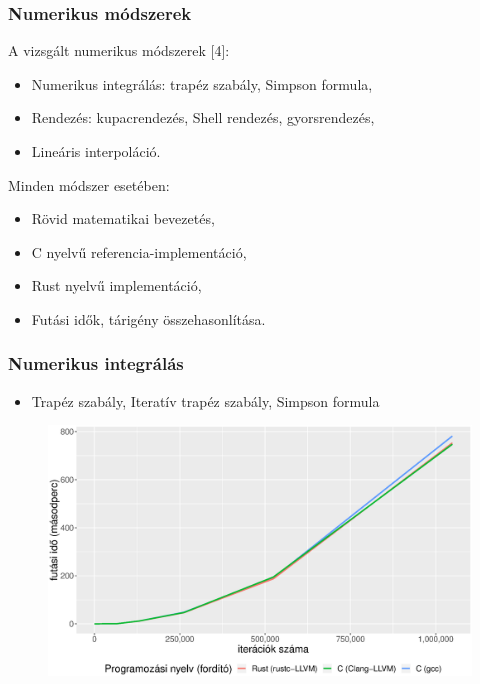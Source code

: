 \documentclass{beamer}
\begin{document}
\begin{frame}[fragile]
\frametitle{Numerikus módszerek}

A vizsgált numerikus módszerek [4]:
\begin{itemize}
\item Numerikus integrálás: trapéz szabály, Simpson formula,
\item Rendezés: kupacrendezés, Shell rendezés, gyorsrendezés,
\item Lineáris interpoláció.
\end{itemize}

\bigskip

Minden módszer esetében:
\begin{itemize}
\item Rövid matematikai bevezetés,
\item C nyelvű referencia-implementáció,
\item Rust nyelvű implementáció,
\item Futási idők, tárigény összehasonlítása.
\end{itemize}

\end{frame}

\begin{frame}[fragile]
\frametitle{Numerikus integrálás}

\begin{itemize}
\item Trapéz szabály, Iteratív trapéz szabály, Simpson formula
\end{itemize}

\begin{figure}[htb]
\begin{center}
	\includegraphics[scale=0.4]{images/simpsons_rule_run.eps}
\end{center}
\end{figure}

\end{frame}
\end{document}
